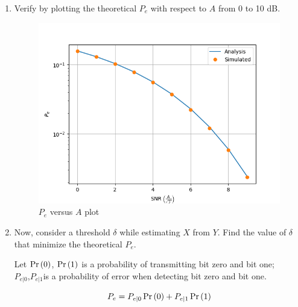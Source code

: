 \documentclass[10pt, a4paper]{article}
\begin{document}
\begin{enumerate}
\item
Verify by plotting  the theoretical $P_e$ with respect to $A$ from 0 to 10 dB.\\
\begin{center}
\end{center}
\begin{figure}[H]
\centering
\includegraphics[width=\columnwidth]{images/ber_snr.png}
\caption{$P_e$ versus $A$ plot}
\label{fig:bpsk_pe_snr}
\end{figure}
%
\item Now, consider a threshold $\delta$  while estimating $X$ from $Y$. Find the value of $\delta$ that minimize the theoretical $P_e$.\\
\label{prob:bpsk_delta_equi}
\solution

Let $\Pr\left(0\right)$, $\Pr\left(1\right)$ is a probability of transmitting bit zero and bit one;\\$P_{e|0}$,$P_{e|1}$is a probability of error when detecting bit zero and bit one.


\begin{equation}
	P_e = P_{e|0} \Pr\left(0\right)+P_{e|1} \Pr\left(1\right)
 \label{eq:error_prob}
\end{equation}


\end{enumerate}
\end{document}
